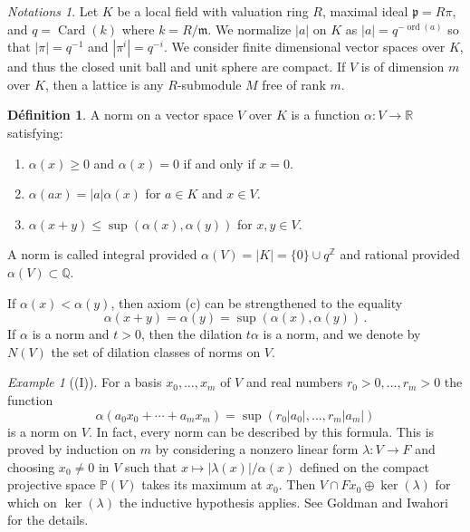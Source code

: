\documentclass[12pt,a4paper]{article}
\theoremstyle{plain}
\theoremstyle{definition}
\newtheorem{definition}{D\'efinition}[section]
\theoremstyle{remark}
\newtheorem{example}{Example}[section]
\newtheorem{notations}{Notations}[section]
\DeclareMathOperator{\Card}{Card}
\DeclareMathOperator{\ord}{ord}
\begin{document}
\begin{notations}
Let $K$ be a local field with valuation ring $R$, maximal ideal 
$\mathfrak{p} = R\pi$, and $q = \Card(k)$ where $k = R/\mathfrak{m}$. We 
normalize $|a|$ on $K$ as $|a| = q^{-\ord(a)}$ so that $|\pi| = q^{-1}$ and 
$|\pi^i| = q^{-i}$. We consider finite dimensional vector spaces over $K$, 
and thus the closed unit ball and unit sphere are compact. If $V$ is of 
dimension $m$ over $K$, then a lattice is any $R$-submodule $M$ free of rank 
$m$.
\end{notations}

\begin{definition}
A norm on a vector space $V$ over $K$ is a function $\alpha\colon V \to \mathbb{R}$ 
satisfying:
\begin{enumerate}[label=(\alph*)]
\item $\alpha(x) \geqslant 0$ and $\alpha(x) = 0$ if and only if $x = 0$.
\item $\alpha(ax) = |a|\alpha(x)$ for $a \in K$ and $x \in V$.
\item $\alpha(x+y) \leqslant \sup(\alpha(x), \alpha(y))$ for $x, y \in V$.
\end{enumerate}
A norm is called integral provided $\alpha(V) = |K| = \{0\} \cup q^\mathbb{Z}$ 
and rational provided $\alpha(V) \subset \mathbb{Q}$.
\end{definition}

If $\alpha(x) < \alpha(y)$, then axiom (c) can be strengthened to the equality
\[
\alpha(x+y) = \alpha(y) = \sup(\alpha(x), \alpha(y)) \,.
\]
If $\alpha$ is a norm and $t > 0$, then the dilation $t\alpha$ is a norm, and 
we denote by $N(V)$ the set of dilation classes of norms on $V$.

\begin{example}[(I)]
For a basis $x_0, \ldots, x_m$ of $V$ and real numbers $r_0 > 0, \ldots, r_m > 0$ 
the function
\[
\alpha(a_0 x_0 + \cdots + a_m x_m) = \sup(r_0|a_0|, \ldots, r_m|a_m|)
\]
is a norm on $V$. In fact, every norm can be described by this formula. This 
is proved by induction on $m$ by considering a nonzero linear form 
$\lambda\colon V \to F$ and choosing $x_0 \neq 0$ in $V$ such that 
$x \mapsto |\lambda(x)|/\alpha(x)$ defined on the compact projective space 
$\mathbb{P}(V)$ takes its maximum at $x_0$. Then $V \cap Fx_0 \oplus \ker(\lambda)$ 
for which on $\ker(\lambda)$ the inductive hypothesis applies. See Goldman and 
Iwahori for the details.
\end{example}
\end{document}
